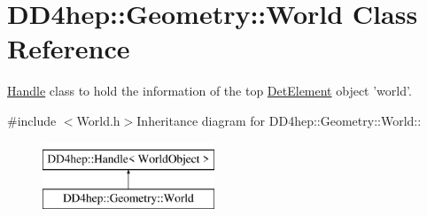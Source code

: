 \hypertarget{class_d_d4hep_1_1_geometry_1_1_world}{
\section{DD4hep::Geometry::World Class Reference}
\label{class_d_d4hep_1_1_geometry_1_1_world}
}


\hyperlink{class_d_d4hep_1_1_handle}{Handle} class to hold the information of the top \hyperlink{class_d_d4hep_1_1_geometry_1_1_det_element}{DetElement} object 'world'.  


{\ttfamily \#include $<$World.h$>$}Inheritance diagram for DD4hep::Geometry::World::\begin{figure}[H]
\begin{center}
\leavevmode
\includegraphics[height=2cm]{class_d_d4hep_1_1_geometry_1_1_world}
\end{center}
\end{figure}
